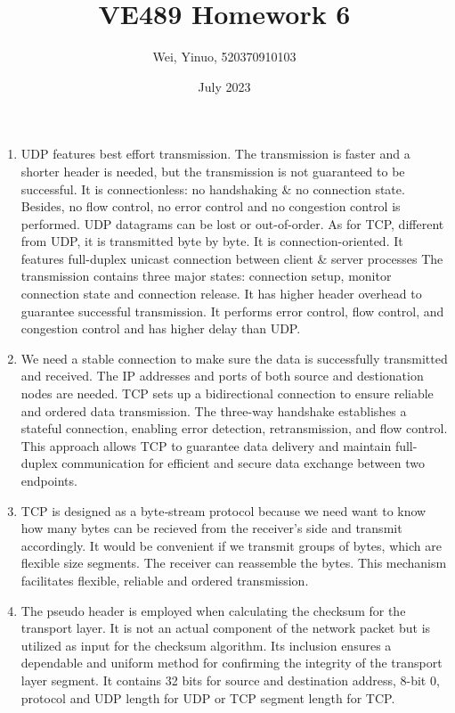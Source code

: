 \documentclass{article}
\title{VE489 Homework 6}
\author{Wei, Yinuo, 520370910103}
\date{July 2023}
\begin{document}
\maketitle

\begin{enumerate}
    \item 
    UDP features best effort transmission. The transmission is faster and a shorter header is needed, but the transmission is not guaranteed to be successful. It is connectionless: no handshaking & no connection state. Besides, no flow control, no error control and no congestion control is performed. UDP datagrams can be lost or out-of-order.
    \newline 
    As for TCP, different from UDP, it is transmitted byte by byte. It is connection-oriented. It features full-duplex unicast connection between client & server processes
    The transmission contains three major states: connection setup, monitor connection state and connection release. It has higher header overhead to guarantee successful transmission. It performs error control, flow control, and congestion control and has higher delay than UDP.
    
    
    \item
    We need a stable connection to make sure the data is successfully transmitted and received. The IP addresses and ports of both source and destionation nodes are needed. TCP sets up a bidirectional connection to ensure reliable and ordered data transmission. The three-way handshake establishes a stateful connection, enabling error detection, retransmission, and flow control. This approach allows TCP to guarantee data delivery and maintain full-duplex communication for efficient and secure data exchange between two endpoints.
    
    \item
    TCP is designed as a byte‐stream protocol because we need want to know how many bytes can be recieved from the receiver's side and transmit accordingly. It would be convenient if we transmit groups of bytes, which are flexible size segments. The receiver can reassemble the bytes. This mechanism facilitates flexible, reliable and ordered transmission.
    
    \item
    The pseudo header is employed when calculating the checksum for the transport layer. It is not an actual component of the network packet but is utilized as input for the checksum algorithm. Its inclusion ensures a dependable and uniform method for confirming the integrity of the transport layer segment.
    It contains 32 bits for source and destination address, 8-bit 0, protocol and UDP length for UDP or TCP segment length for TCP. 
    

\end{enumerate}
\end{document}
